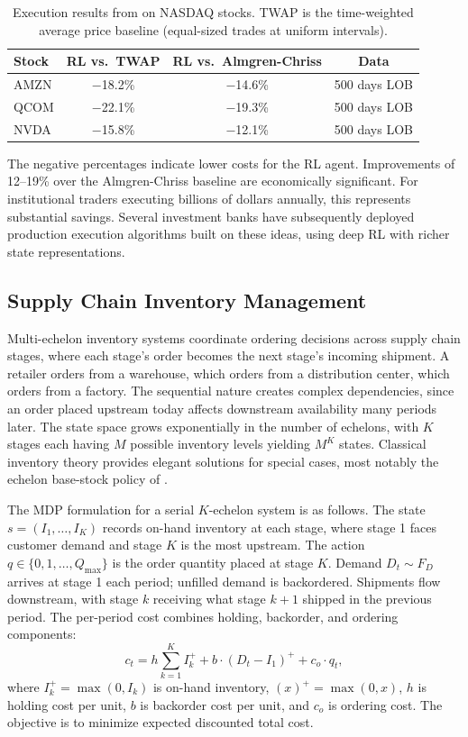 \begin{table}[htbp]
\centering
\caption{Execution results from \citet{Nevmyvaka2006execution} on NASDAQ stocks. TWAP is the time-weighted average price baseline (equal-sized trades at uniform intervals).}
\label{tab:execution_results}
\begin{tabular}{lccc}
\toprule
Stock & RL vs.\ TWAP & RL vs.\ Almgren-Chriss & Data \\
\midrule
AMZN & $-$18.2\% & $-$14.6\% & 500 days LOB \\
QCOM & $-$22.1\% & $-$19.3\% & 500 days LOB \\
NVDA & $-$15.8\% & $-$12.1\% & 500 days LOB \\
\bottomrule
\end{tabular}
\end{table}

The negative percentages indicate lower costs for the RL agent. Improvements of 12--19\% over the Almgren-Chriss baseline are economically significant. For institutional traders executing billions of dollars annually, this represents substantial savings. Several investment banks have subsequently deployed production execution algorithms built on these ideas, using deep RL with richer state representations.


\subsection{Supply Chain Inventory Management}
\label{sec:inventory}

Multi-echelon inventory systems coordinate ordering decisions across supply chain stages, where each stage's order becomes the next stage's incoming shipment. A retailer orders from a warehouse, which orders from a distribution center, which orders from a factory. The sequential nature creates complex dependencies, since an order placed upstream today affects downstream availability many periods later. The state space grows exponentially in the number of echelons, with $K$ stages each having $M$ possible inventory levels yielding $M^K$ states. Classical inventory theory provides elegant solutions for special cases, most notably the echelon base-stock policy of \citet{ClarkScarf1960inventory}.

The MDP formulation for a serial $K$-echelon system is as follows. The state $s = (I_1, \ldots, I_K)$ records on-hand inventory at each stage, where stage 1 faces customer demand and stage $K$ is the most upstream. The action $q \in \{0, 1, \ldots, Q_{\max}\}$ is the order quantity placed at stage $K$. Demand $D_t \sim F_D$ arrives at stage 1 each period; unfilled demand is backordered. Shipments flow downstream, with stage $k$ receiving what stage $k+1$ shipped in the previous period. The per-period cost combines holding, backorder, and ordering components:
\begin{equation}
c_t = h \sum_{k=1}^{K} I_k^+ + b \cdot (D_t - I_1)^+ + c_o \cdot q_t,
\end{equation}
where $I_k^+ = \max(0, I_k)$ is on-hand inventory, $(x)^+ = \max(0, x)$, $h$ is holding cost per unit, $b$ is backorder cost per unit, and $c_o$ is ordering cost. The objective is to minimize expected discounted total cost.

